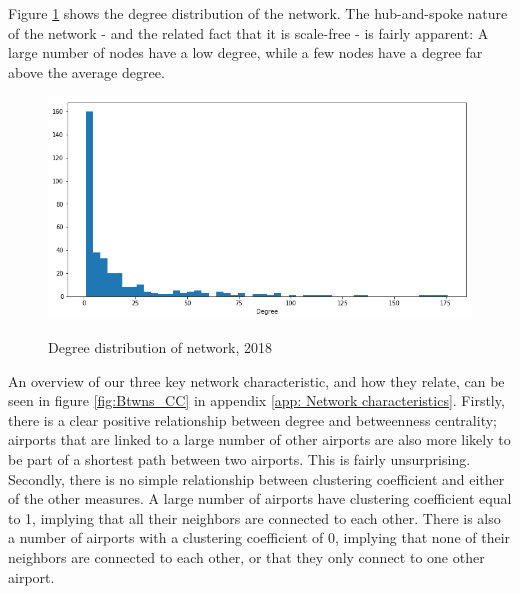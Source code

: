 Figure \ref{fig:degreeDistribution} shows the degree distribution of the network. The hub-and-spoke nature of the network - and the related fact that it is scale-free - is fairly apparent: A large number of nodes have a low degree, while a few nodes have a degree far above the average degree. 
\begin{figure}[H]
  \centering
  \caption{Degree distribution of network, 2018}
    \includegraphics[width=0.6 \textwidth]{Exam/Figures/degreeDistribution.png}
  \label{fig:degreeDistribution}
\end{figure}
An overview of our three key network characteristic, and how they relate, can be seen in figure \ref{fig:Btwns_CC} in appendix \ref{app: Network characteristics}. Firstly, there is a clear positive relationship between degree and betweenness centrality; airports that are linked to a large number of other airports are also more likely to be part of a shortest path between two airports. This is fairly unsurprising. Secondly, there is no simple relationship between clustering coefficient and either of the other measures. A large number of airports have clustering coefficient equal to 1, implying that all their neighbors are connected to each other. There is also a number of airports with a clustering coefficient of 0, implying that none of their neighbors are connected to each other, or that they only connect to one other airport. 

